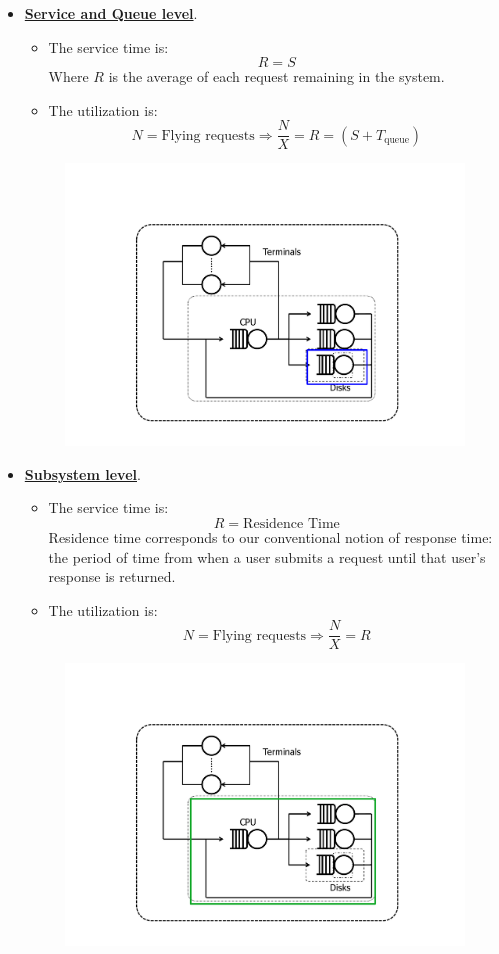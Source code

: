 \begin{itemize}
	\item \textbf{\underline{Service and Queue level}}. 
	\begin{itemize}
		\item The service time is:
		\begin{equation*}
			R = S
		\end{equation*}
		Where $R$ is the average of each request remaining in the system.
		\item The utilization is:
		\begin{equation*}
			N = \text{Flying requests} \Rightarrow \dfrac{N}{X} = R = \left(S + T_{\text{queue}}\right)
		\end{equation*}
	\end{itemize}
	\begin{figure}[!htp]
		\centering
		\includegraphics[width=.7\textwidth]{img/little-law-2.pdf}
	\end{figure}
	
	\item \textbf{\underline{Subsystem level}}. 
	\begin{itemize}
		\item The service time is:
		\begin{equation*}
			R = \text{Residence Time}
		\end{equation*}
		Residence time corresponds to our conventional notion of response time: the period of time from when a user submits a request until that user's response is returned.
		\item The utilization is:
		\begin{equation*}
			N = \text{Flying requests} \Rightarrow \dfrac{N}{X} = R
		\end{equation*}
	\end{itemize}
	\begin{figure}[!htp]
		\centering
		\includegraphics[width=.7\textwidth]{img/little-law-3.pdf}
	\end{figure}
	

\end{itemize}
